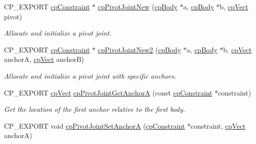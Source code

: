 \begin{DoxyCompactItemize}
\mbox{\label{group__cp_pivot_joint_ga607b18e16daa40c318ab98e5c6f4970f}} 
C\+P\+\_\+\+E\+X\+P\+O\+RT \mbox{\hyperlink{structcp_constraint}{cp\+Constraint}} $\ast$ \mbox{\hyperlink{group__cp_pivot_joint_ga607b18e16daa40c318ab98e5c6f4970f}{cp\+Pivot\+Joint\+New}} (\mbox{\hyperlink{structcp_body}{cp\+Body}} $\ast$a, \mbox{\hyperlink{structcp_body}{cp\+Body}} $\ast$b, \mbox{\hyperlink{structcp_vect}{cp\+Vect}} pivot)
\begin{DoxyCompactList}\small\item\em Allocate and initialize a pivot joint. \end{DoxyCompactList}\item 
\mbox{\label{group__cp_pivot_joint_ga291d36413adcfdc21a3a30185b76254d}} 
C\+P\+\_\+\+E\+X\+P\+O\+RT \mbox{\hyperlink{structcp_constraint}{cp\+Constraint}} $\ast$ \mbox{\hyperlink{group__cp_pivot_joint_ga291d36413adcfdc21a3a30185b76254d}{cp\+Pivot\+Joint\+New2}} (\mbox{\hyperlink{structcp_body}{cp\+Body}} $\ast$a, \mbox{\hyperlink{structcp_body}{cp\+Body}} $\ast$b, \mbox{\hyperlink{structcp_vect}{cp\+Vect}} anchorA, \mbox{\hyperlink{structcp_vect}{cp\+Vect}} anchorB)
\begin{DoxyCompactList}\small\item\em Allocate and initialize a pivot joint with specific anchors. \end{DoxyCompactList}\item 
\mbox{\label{group__cp_pivot_joint_ga76c5b8adbe7e10fdaf7dfc9866a8f931}} 
C\+P\+\_\+\+E\+X\+P\+O\+RT \mbox{\hyperlink{structcp_vect}{cp\+Vect}} \mbox{\hyperlink{group__cp_pivot_joint_ga76c5b8adbe7e10fdaf7dfc9866a8f931}{cp\+Pivot\+Joint\+Get\+AnchorA}} (const \mbox{\hyperlink{structcp_constraint}{cp\+Constraint}} $\ast$constraint)
\begin{DoxyCompactList}\small\item\em Get the location of the first anchor relative to the first body. \end{DoxyCompactList}\item 
\mbox{\label{group__cp_pivot_joint_ga316f028e556a996079c877535f6bf62a}} 
C\+P\+\_\+\+E\+X\+P\+O\+RT void \mbox{\hyperlink{group__cp_pivot_joint_ga316f028e556a996079c877535f6bf62a}{cp\+Pivot\+Joint\+Set\+AnchorA}} (\mbox{\hyperlink{structcp_constraint}{cp\+Constraint}} $\ast$constraint, \mbox{\hyperlink{structcp_vect}{cp\+Vect}} anchorA)

\end{DoxyCompactItemize}

